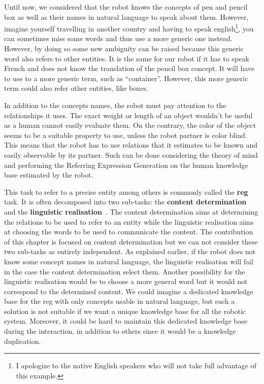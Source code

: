 Until now, we considered that the robot knows the concepts of pen and pencil box as well as their names in natural language to speak about them. However, imagine yourself travelling in another country and having to speak english\footnote{I apologize to the native English speakers who will not take full advantage of this example.}, you can sometimes miss some words and thus use a more generic one instead. However, by doing so some new ambiguity can be raised because this generic word also refers to other entities. It is the same for our robot if it has to speak French and does not know the translation of the pencil box concept. It will have to use to a more generic term, such as ``container''. However, this more generic term could also refer other entities, like boxes.

In addition to the concepts names, the robot must pay attention to the relationships it uses. The exact weight or length of an object wouldn't be useful as a human cannot easily evaluate them. On the contrary, the color of the object seems to be a suitable property to use, unless the robot partner is color blind. This means that the robot has to use relations that it estimates to be known and easily observable by its partner. Such can be done considering the theory of mind and performing the Referring Expression Generation on the human knowledge base estimated by the robot.

This task to refer to a precise entity among others is commonly called the \textbf{\acrfull{reg}} task. It is often decomposed into two sub-tasks: the \textbf{content determination} and the \textbf{linguistic realisation}~\cite{krahmer_2012_computational}. The content determination aims at determining the relations to be used to refer to an entity while the linguistic realisation aims at choosing the words to be used to communicate the content. The contribution of this chapter is focused on content determination but we can not consider these two sub-tasks as entirely independent. As explained earlier, if the robot does not know some concept names in natural language, the linguistic realisation will fail in the case the content determination select them. Another possibility for the linguistic realisation would be to choose a more general word but it would not correspond to the determined content. We could imagine a dedicated knowledge base for the \acrshort{reg} with only concepts usable in natural language, but such a solution is not suitable if we want a unique knowledge base for all the robotic system. Moreover, it could be hard to maintain this dedicated knowledge base during the interaction, in addition to others since it would be a knowledge duplication.

